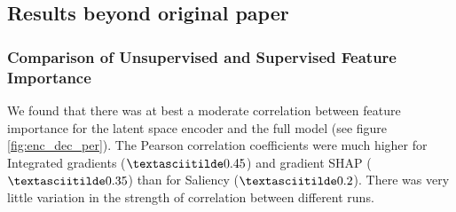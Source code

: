 

\subsection{Results beyond original paper}
 






\subsubsection{Comparison of Unsupervised and Supervised Feature Importance}


We found that there was at best a moderate correlation between feature importance for the latent space encoder and the full model (see figure \ref{fig:enc_dec_per}). The Pearson correlation coefficients were much higher for Integrated gradients ($\textasciitilde 0.45$) and gradient SHAP ($ \textasciitilde 0.35$) than for Saliency ($\textasciitilde0.2$). There was very little variation in the strength of correlation between different runs.




